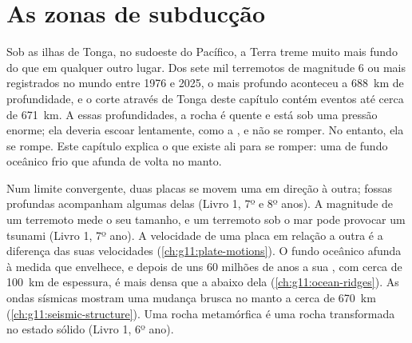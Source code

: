 \chapter{As zonas de subducção}\label{ch:g11:subduction-zones}

Sob as ilhas de Tonga, no sudoeste do Pacífico, a Terra treme muito mais
fundo do que em qualquer outro lugar. Dos sete mil terremotos de magnitude 6
ou mais registrados no mundo entre 1976 e 2025, o mais profundo aconteceu a
\qty{688}{km} de profundidade, e o corte através de Tonga deste capítulo
contém eventos até cerca de \qty{671}{km}. A essas profundidades, a rocha é
quente e está sob uma pressão enorme; ela deveria escoar lentamente, como a
, e não se romper. No entanto, ela se rompe. Este capítulo
explica o que existe ali para se romper: uma  de fundo oceânico frio que
afunda de volta no manto.

\begin{recall}
Num limite convergente, duas placas se movem uma em direção à outra; fossas
profundas acompanham algumas delas (Livro 1, 7º e 8º anos). A magnitude de
um terremoto mede o seu tamanho, e um terremoto sob o mar pode provocar um
tsunami (Livro 1, 7º ano). A velocidade de uma placa em relação a outra é a
diferença das suas velocidades (\cref{ch:g11:plate-motions}). O fundo
oceânico afunda à medida que envelhece, e depois de uns 60 milhões de anos a
sua , com cerca de \qty{100}{km} de espessura, é mais densa que a
 abaixo dela (\cref{ch:g11:ocean-ridges}). As ondas sísmicas
mostram uma mudança brusca no manto a cerca de \qty{670}{km}
(\cref{ch:g11:seismic-structure}). Uma rocha metamórfica é uma rocha
transformada no estado sólido (Livro 1, 6º ano).
\end{recall}

